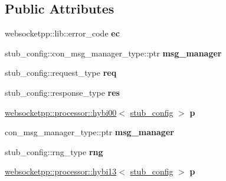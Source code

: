 \subsection*{Public Attributes}
\begin{DoxyCompactItemize}
\item 
websocketpp\+::lib\+::error\+\_\+code {\bfseries ec}\hypertarget{structprocessor__setup_a4317b669be75123ab3301f66890e8ccc}{}\label{structprocessor__setup_a4317b669be75123ab3301f66890e8ccc}

\item 
stub\+\_\+config\+::con\+\_\+msg\+\_\+manager\+\_\+type\+::ptr {\bfseries msg\+\_\+manager}\hypertarget{structprocessor__setup_a7e5874fd9215c912a4b45a5595d393b6}{}\label{structprocessor__setup_a7e5874fd9215c912a4b45a5595d393b6}

\item 
stub\+\_\+config\+::request\+\_\+type {\bfseries req}\hypertarget{structprocessor__setup_a980e15fe985e1b98b603d7cdfe7c59ae}{}\label{structprocessor__setup_a980e15fe985e1b98b603d7cdfe7c59ae}

\item 
stub\+\_\+config\+::response\+\_\+type {\bfseries res}\hypertarget{structprocessor__setup_a4f0a5fc919ad24998c07b4e9ea14497e}{}\label{structprocessor__setup_a4f0a5fc919ad24998c07b4e9ea14497e}

\item 
\hyperlink{classwebsocketpp_1_1processor_1_1hybi00}{websocketpp\+::processor\+::hybi00}$<$ \hyperlink{structstub__config}{stub\+\_\+config} $>$ {\bfseries p}\hypertarget{structprocessor__setup_a59097e2a73856213db06663c439f45dd}{}\label{structprocessor__setup_a59097e2a73856213db06663c439f45dd}

\item 
con\+\_\+msg\+\_\+manager\+\_\+type\+::ptr {\bfseries msg\+\_\+manager}\hypertarget{structprocessor__setup_a9243eed7f1b4feff6e614372bc95a97d}{}\label{structprocessor__setup_a9243eed7f1b4feff6e614372bc95a97d}

\item 
stub\+\_\+config\+::rng\+\_\+type {\bfseries rng}\hypertarget{structprocessor__setup_a7bbb72ae0cad9525e149c1c3b3f7d61f}{}\label{structprocessor__setup_a7bbb72ae0cad9525e149c1c3b3f7d61f}

\item 
\hyperlink{classwebsocketpp_1_1processor_1_1hybi13}{websocketpp\+::processor\+::hybi13}$<$ \hyperlink{structstub__config}{stub\+\_\+config} $>$ {\bfseries p}\hypertarget{structprocessor__setup_a99c2a7222df023e004a08981332c19e8}{}\label{structprocessor__setup_a99c2a7222df023e004a08981332c19e8}

\end{DoxyCompactItemize}


